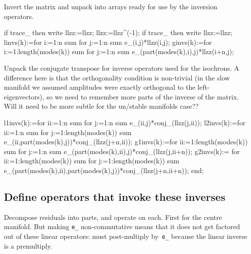 \documentclass[11pt,a5paper]{article}
\begin{document}
Invert the matrix and unpack into arrays ready for use by the inversion operators.
\begin{reduce}
if trace_ then write llzz:=llzz; 
  llzz:=llzz^(-1);
if trace_ then write llzz:=llzz;
  linvs(k):=for i:=1:n sum for j:=1:n sum e_(i,j)*llzz(i,j);
  ginvs(k):=for i:=1:length(modes(k)) sum 
    for j:=1:n sum e_(part(modes(k),i),j)*llzz(i+n,j);
\end{reduce}

Unpack the conjugate transpose for inverse operators used for the isochrons.  
A difference here is that the orthogonality condition is non-trivial (in the slow manifold we assumed amplitudes were exactly orthogonal to the left-eigenvectors), so we need to remember more parts of the inverse of the matrix.
Will it need to be more subtle for the un/stable manifolds case??
\begin{reduce}
  l1invs(k):=for ii:=1:n sum for j:=1:n sum 
      e_(ii,j)*conj_(llzz(j,ii));
  l2invs(k):=for ii:=1:n sum for j:=1:length(modes(k)) sum 
      e_(ii,part(modes(k),j))*conj_(llzz(j+n,ii));
  g1invs(k):=for ii:=1:length(modes(k)) sum for j:=1:n sum 
      e_(part(modes(k),ii),j)*conj_(llzz(j,ii+n));
  g2invs(k):=
    for ii:=1:length(modes(k)) sum for j:=1:length(modes(k)) sum 
      e_(part(modes(k),ii),part(modes(k),j))*conj_(llzz(j+n,ii+n));
end;
\end{reduce}


\subsection{Define operators that invoke these inverses}
Decompose residuals into parts, and operate on each.
First for the centre manifold.
But making \verb|e_| non-commutative means that it does not get factored out of these linear operators: must post-multiply by~\verb|e_| because the linear inverse is a premultiply.

\end{document}
